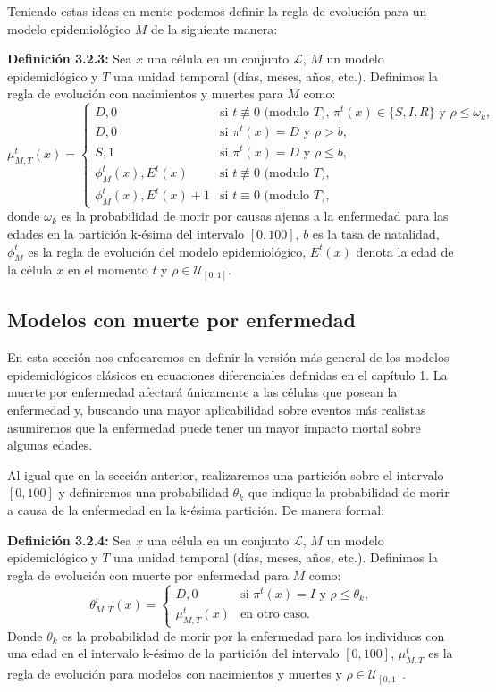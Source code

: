 Teniendo estas ideas en mente podemos definir la regla de evolución para un modelo epidemiológico $M$ de la siguiente manera:

\textbf{Definición 3.2.3:} Sea $x$ una célula en un conjunto $\mathcal{L}$, $M$ un modelo epidemiológico y $T$ una unidad temporal (días, meses, años, etc.). Definimos la regla de evolución con nacimientos y muertes para $M$ como:
\begin{equation}
    \mu_{M,T}^t(x)=\left\{\begin{array}{ll}
        D,0 & \text{si }t\not\equiv 0 \text{ (modulo }T\text{), }\pi^t(x)\in\{S,I,R\}\text{ y }\rho\leq\omega_k, \\
        D,0 & \text{si }\pi^t(x)=D\text{ y }\rho>b,\\
        S,1 & \text{si }\pi^t(x)=D\text{ y }\rho\leq b,\\
        \phi_M^t(x),E^t(x) & \text{si }t\not\equiv 0 \text{ (modulo }T),\\
        \phi_M^t(x),E^t(x)+1 & \text{si }t\equiv 0 \text{ (modulo }T),
    \end{array}\right.
\end{equation}
donde $\omega_k$ es la probabilidad de morir por causas ajenas a la enfermedad para las edades en la partición k-ésima del intervalo $[0,100]$, $b$ es la tasa de natalidad, $\phi_M^t$ es la regla de evolución del modelo epidemiológico, $E^t(x)$ denota la edad de la célula $x$ en el momento $t$ y $\rho\in\mathcal{U}_{[0,1]}$.
\subsection{Modelos con muerte por enfermedad}
En esta sección nos enfocaremos en definir la versión más general de los modelos epidemiológicos clásicos en ecuaciones diferenciales definidas en el capítulo 1. La muerte por enfermedad afectará únicamente a las células que posean la enfermedad y, buscando una mayor aplicabilidad sobre eventos más realistas asumiremos que la enfermedad puede tener un mayor impacto mortal sobre algunas edades. 

Al igual que en la sección anterior, realizaremos una partición sobre el intervalo $[0,100]$ y definiremos una probabilidad $\theta_k$ que indique la probabilidad de morir a causa de la enfermedad en la k-ésima partición. De manera formal:

\textbf{Definición 3.2.4:} Sea $x$ una célula en un conjunto $\mathcal{L}$, $M$ un modelo epidemiológico y $T$ una unidad temporal (días, meses, años, etc.). Definimos la regla de evolución con muerte por enfermedad para $M$ como:
\begin{equation}
    \theta_{M,T}^t(x)=\left\{\begin{array}{ll}
        D,0 & \text{si }\pi^t(x)=I\text{ y }\rho\leq\theta_k, \\
        \mu_{M,T}^t(x) & \text{en otro caso.}
    \end{array}\right.
\end{equation}
Donde $\theta_k$ es la probabilidad de morir por la enfermedad para los individuos con una edad en el intervalo k-ésimo de la partición del intervalo $[0,100]$, $\mu_{M,T}^t$ es la regla de evolución para modelos con nacimientos y muertes y $\rho\in\mathcal{U}_{[0,1]}$.
